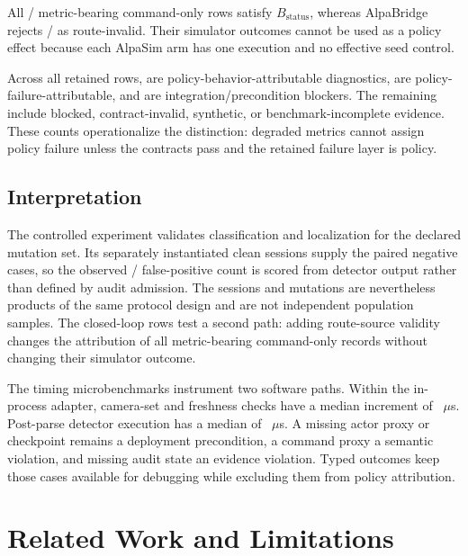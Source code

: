 \documentclass[a4paper,10pt,conference]{ieeeconf}
\begin{document}
All \CVMStatusOnlyAcceptedRuns{}/\CVMStatusOnlyAcceptanceDenominator{} metric-bearing
command-only rows satisfy $B_{\mathrm{status}}$, whereas AlpaBridge rejects
\CVMContractInvalidRejectedRuns{}/\CVMContractInvalidRejectionDenominator{} as
route-invalid. Their simulator outcomes cannot be used as a policy effect because each
AlpaSim arm has one execution and no effective seed control.

Across all retained rows, \CVMPolicyBehaviorAttributableRows{} are
policy-behavior-attributable diagnostics, \CVMPolicyFailureAttributableRows{} are
policy-failure-attributable, and \CVMIntegrationFailureAttributableRows{} are
integration/precondition blockers. The remaining \CVMNonPolicyAttributedRows{} include
blocked, contract-invalid, synthetic, or benchmark-incomplete evidence. These counts
operationalize the distinction: degraded metrics cannot assign policy failure unless
the contracts pass and the retained failure layer is policy.

\subsection{Interpretation}

The controlled experiment validates classification and localization for the declared
mutation set. Its \CVMDiagnosticControlCases{} separately instantiated clean sessions
supply the paired negative cases, so the observed
\CVMWODDiagnosticFalsePositives{}/\CVMDiagnosticControlCases{} false-positive count is
scored from detector output rather than defined by audit admission. The sessions and
mutations are nevertheless products of the same protocol design and are not independent
population samples. The closed-loop rows test a second path: adding route-source validity
changes the attribution of all
\CVMStatusOnlyAcceptedContractRejectedRuns{} metric-bearing command-only records
without changing their simulator outcome.

The timing microbenchmarks instrument two software paths. Within the in-process adapter,
camera-set and freshness checks have a median increment of
\CVMAdapterGuardIncrementMedianUs{}~$\mu$s. Post-parse detector execution has a median
of \CVMFaultDetectorMedianUs{}~$\mu$s. A missing actor proxy or checkpoint remains a deployment
precondition, a command proxy a semantic violation, and missing audit state an evidence
violation. Typed outcomes keep those cases available for debugging while excluding
them from policy attribution.

\section{Related Work and Limitations}
\end{document}
